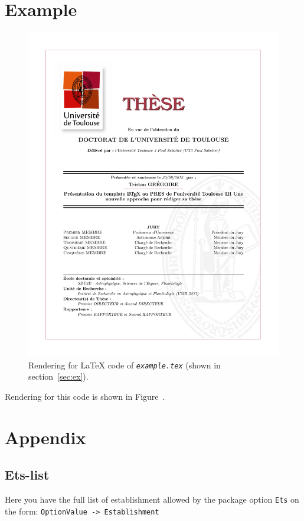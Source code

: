 \documentclass{scrartcl}
\newcommand*{\file}[1]{\textit{\texttt{#1}}}
\begin{document}
\section{Example\label{sec:ex}}

\begin{figure}[h!]
    \centering
    \includegraphics[width=\textwidth]{example.pdf}
    \caption{\label{fig:ex}
        Rendering for \LaTeX{} code of \file{example.tex} (shown in section~\ref{sec:ex}).
    }
\end{figure}
Rendering for this code is shown in Figure~.

\section*{Appendix}
\subsection{Ets-list\label{ssec:Ets}}
Here you have the full list of establishment allowed by the package option \texttt{Ets} on the form:
\texttt{OptionValue -> Establishment}

\end{document}
